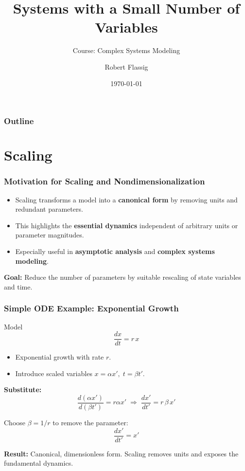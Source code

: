 \documentclass{beamer}
\title{Systems with a Small Number of
Variables}
\subtitle{Course: Complex Systems Modeling}
\author{Robert Flassig}
\institute{Brandenburg University of Applied Sciences}
\date{\today}
\begin{document}
\begin{frame}
\titlepage
\end{frame}

\begin{frame}
\frametitle{Outline}
\tableofcontents
\end{frame}

\section{Scaling}
\begin{frame}
\frametitle{Motivation for Scaling and Nondimensionalization}

\begin{itemize}
    \item Scaling transforms a model into a \textbf{canonical form} by removing units and redundant parameters.
    \item This highlights the \textbf{essential dynamics} independent of arbitrary units or parameter magnitudes.
    \item Especially useful in \textbf{asymptotic analysis} and \textbf{complex systems modeling}.
\end{itemize}

\vspace{0.3cm}
\textbf{Goal:} Reduce the number of parameters by suitable rescaling of
state variables and time.
\end{frame}

\begin{frame}
\frametitle{Simple ODE Example: Exponential Growth}
\scriptsize
\begin{block}{Model}
\[
\frac{dx}{dt} = r\,x
\]
\end{block}

\small
\begin{itemize}
    \item Exponential growth with rate \(r\).
    \item Introduce scaled variables \(x = \alpha x',\; t = \beta t'\).
\end{itemize}

\medskip
\textbf{Substitute:}
\[
\frac{d(\alpha x')}{d(\beta t')} = r \alpha x'
\;\Rightarrow\;
\frac{dx'}{dt'} = r\,\beta\,x'
\]

\medskip
Choose \(\beta = 1/r\) to remove the parameter:
\[
\boxed{\frac{dx'}{dt'} = x'}
\]

\textbf{Result:} Canonical, dimensionless form.  
Scaling removes units and exposes the fundamental dynamics.
\end{frame}
\end{document}
